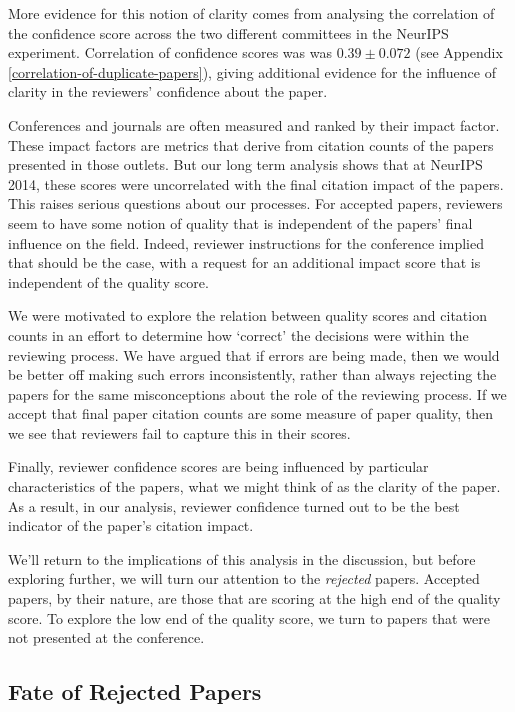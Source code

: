 \documentclass[twoside]{article}
\begin{document}
More evidence for this notion of clarity comes from analysing the correlation of the confidence score across the two different committees in the NeurIPS experiment. Correlation of confidence scores was was $0.39 \pm 0.072$ (see Appendix \ref{correlation-of-duplicate-papers}), giving additional evidence for the influence of clarity in the reviewers' confidence about the paper.

Conferences and journals are often measured and ranked by their impact factor. These impact factors are metrics that derive from citation counts of the papers presented in those outlets. But our long term analysis shows that at NeurIPS 2014, these scores were uncorrelated with the final citation impact of the papers. This raises serious questions about our processes. For accepted papers, reviewers seem to have some notion of quality that is independent of the papers' final influence on the field. Indeed, reviewer instructions for the conference implied that should be the case, with a request for an additional impact score that is independent of the quality score.

We were motivated to explore the relation between quality scores and citation counts in an effort to determine how `correct' the decisions were within the reviewing process. We have argued that if errors are being made, then we would be better off making such errors inconsistently, rather than always rejecting the papers for the same misconceptions about the role of the reviewing process. If we accept that final paper citation counts are some measure of paper quality, then we see that reviewers fail to capture this in their scores.

Finally, reviewer confidence scores are being influenced by particular characteristics of the papers, what we might think of as the clarity of the paper. As a result, in our analysis, reviewer confidence turned out to be the best indicator of the paper's citation impact.

We'll return to the implications of this analysis in the discussion, but before exploring further, we will turn our attention to the \emph{rejected} papers. Accepted papers, by their nature, are those that are scoring at the high end of the quality score. To explore the low end of the quality score, we turn to papers that were not presented at the conference.

\subsection{Fate of Rejected Papers}
\end{document}

